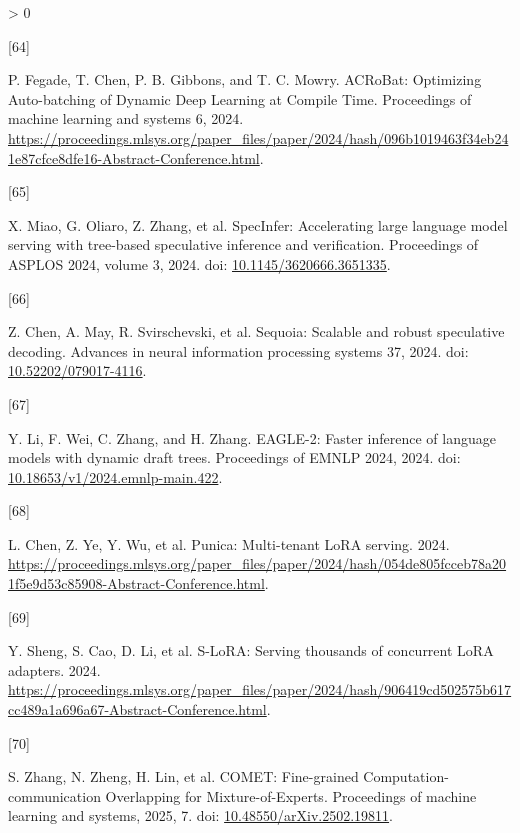 \documentclass[UTF8,10.5pt,fontset=windows]{ctexart}
\newlength{\cslhangindent}
\newlength{\csllabelwidth}
\newenvironment{CSLReferences}[2] %
 {%
  \setlength{\parindent}{0pt}
  \ifodd #1 \everypar{\setlength{\hangindent}{\cslhangindent}}\ignorespaces\fi
  \ifnum #2 > 0
  \setlength{\parskip}{#2\baselineskip}
  \fi
 }%
 {}
\newcommand{\CSLLeftMargin}[1]{\parbox[t]{\csllabelwidth}{#1}}
\newcommand{\CSLRightInline}[1]{\parbox[t]{\linewidth - \csllabelwidth}{#1}\break}
\begin{document}
\begin{CSLReferences}{0}{0}
\leavevmode{}%
\CSLLeftMargin{{[}64{]} }
\CSLRightInline{P. Fegade, T. Chen, P. B. Gibbons, and T. C. Mowry.
{ACRoBat: Optimizing Auto-batching of Dynamic Deep Learning at Compile
Time}. Proceedings of machine learning and systems 6, 2024.
\url{https://proceedings.mlsys.org/paper_files/paper/2024/hash/096b1019463f34eb241e87cfce8dfe16-Abstract-Conference.html}.}

\leavevmode{}%
\CSLLeftMargin{{[}65{]} }
\CSLRightInline{X. Miao, G. Oliaro, Z. Zhang, et al. SpecInfer:
Accelerating large language model serving with tree-based speculative
inference and verification. Proceedings of ASPLOS 2024, volume 3, 2024.
doi:
\href{https://doi.org/10.1145/3620666.3651335}{10.1145/3620666.3651335}.}

\leavevmode{}%
\CSLLeftMargin{{[}66{]} }
\CSLRightInline{Z. Chen, A. May, R. Svirschevski, et al. Sequoia:
Scalable and robust speculative decoding. Advances in neural information
processing systems 37, 2024. doi:
\href{https://doi.org/10.52202/079017-4116}{10.52202/079017-4116}.}

\leavevmode{}%
\CSLLeftMargin{{[}67{]} }
\CSLRightInline{Y. Li, F. Wei, C. Zhang, and H. Zhang. EAGLE-2: Faster
inference of language models with dynamic draft trees. Proceedings of
EMNLP 2024, 2024. doi:
\href{https://doi.org/10.18653/v1/2024.emnlp-main.422}{10.18653/v1/2024.emnlp-main.422}.}

\leavevmode{}%
\CSLLeftMargin{{[}68{]} }
\CSLRightInline{L. Chen, Z. Ye, Y. Wu, et al. Punica: Multi-tenant LoRA
serving. 2024.
\url{https://proceedings.mlsys.org/paper_files/paper/2024/hash/054de805fcceb78a201f5e9d53c85908-Abstract-Conference.html}.}

\leavevmode{}%
\CSLLeftMargin{{[}69{]} }
\CSLRightInline{Y. Sheng, S. Cao, D. Li, et al. S-LoRA: Serving
thousands of concurrent LoRA adapters. 2024.
\url{https://proceedings.mlsys.org/paper_files/paper/2024/hash/906419cd502575b617cc489a1a696a67-Abstract-Conference.html}.}

\leavevmode{}%
\CSLLeftMargin{{[}70{]} }
\CSLRightInline{S. Zhang, N. Zheng, H. Lin, et al. {COMET: Fine-grained
Computation-communication Overlapping for Mixture-of-Experts}.
Proceedings of machine learning and systems, 2025, 7. doi:
\href{https://doi.org/10.48550/arXiv.2502.19811}{10.48550/arXiv.2502.19811}.}


\end{CSLReferences}
\end{document}
